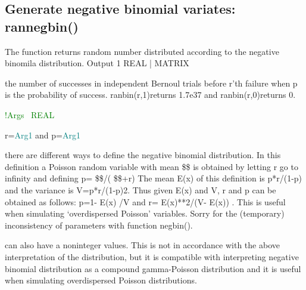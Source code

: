 \subsection{Generate negative binomial variates: \textcolor{VioletRed}{rannegbin}()}
\label{rannegbin}
The  function  returns  random  number  distributed  according to the
negative binomila distribution.
\vspace{0.3cm}
\hline
\vspace{0.3cm}
\noindent Output \tabto{3cm} 1 \tabto{5cm}  REAL | MATRIX  \tabto{7cm}
\begin{changemargin}{3cm}{0cm}
\noindent  the number of successes in
independent Bernoul trials before r’th failure when
p is the probability of success. \textcolor{VioletRed}{ranbin}(r,1)returns 1.7e37 and
\textcolor{VioletRed}{ranbin}(r,0)returns 0.
\end{changemargin}
\vspace{0.3cm}
\hline
\vspace{0.3cm}
\noindent \textcolor{green}{!Args\,\tabto{3cm}\,\,\tabto{5cm}\,\,REAL\,\tabto{7cm}\,}
\begin{changemargin}{3cm}{0cm}
\noindent  r=\textcolor{teal}{Arg1} and p=\textcolor{teal}{Arg1}
\end {changemargin}
\hline
\vspace{0.2cm}
\begin{note}
there are different ways to define the negative binomial distribution. In this definition
a Poisson random variable with mean \$\lamda\$ is obtained by letting r go
to infinity and defining p= \$\lamda\$/( \$\lamda\$+r)
The mean E(x) of this definition is p*r/(1-p) and the variance is V=p*r/(1-p)2. Thus given
E(x) and V, r and p can be obtained as follows: p=1- E(x) /V and r= E(x)**2/(V- E(x)) . This is useful when
simulating ‘overdispersed Poisson’ variables. Sorry for the (temporary) inconsistency of parameters with
function \textcolor{VioletRed}{negbin}().
\end{note}
\begin{note}
can also have a noninteger values. This is not in accordance with the above
interpretation of the distribution, but it is compatible with interpreting negative binomial
distribution as a compound gamma-Poisson distribution and it is useful when simulating
overdispersed Poisson distributions.
\end{note}
